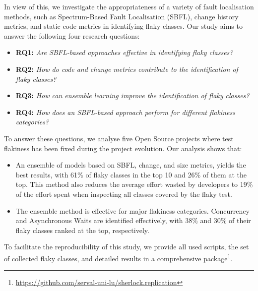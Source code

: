 In view of this, we investigate the appropriateness of a variety of fault localisation methods, such as Spectrum-Based Fault Localisation (SBFL), change history metrics, and static code metrics in identifying flaky classes. 
Our study aims to answer the following four research questions:

\begin{itemize}[label={}]
    \item \textbf{\textsc{RQ1:}} \emph{Are SBFL-based approaches effective in identifying flaky classes?}
    \item \textbf{\textsc{RQ2:}} \emph{How do code and change metrics contribute to the identification of flaky classes?}
    \item \textbf{\textsc{RQ3:}} \emph{How can ensemble learning improve the identification of flaky classes?}
    \item \textbf{\textsc{RQ4:}} \emph{How does an SBFL-based approach perform for different flakiness categories?}
\end{itemize}

To answer these questions, we analyse five Open Source projects where test flakiness has been fixed during the project evolution. Our analysis shows that: 
\begin{itemize}
    \item An ensemble of models based on SBFL, change, and size metrics, yields the best results, with 61\% of flaky classes in the top 10 and 26\% of them at the top. 
    This method also reduces the average effort wasted by developers to 19\% of the effort spent when inspecting all classes covered by the flaky test.
    \item The ensemble method is effective for major flakiness categories. Concurrency and Asynchronous Waits are identified effectively, with 38\% and 30\% of their flaky classes ranked at the top, respectively.
\end{itemize}

To facilitate the reproducibility of this study, we provide all used scripts,  the set of collected flaky classes, and detailed results in a comprehensive package\footnote{\url{https://github.com/serval-uni-lu/sherlock.replication}}.
